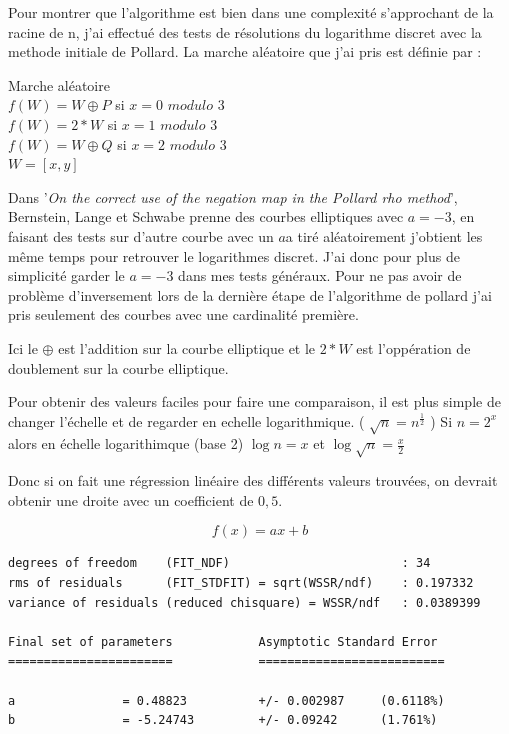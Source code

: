 \documentclass[a4paper,10pt]{report}
\newcommand{\article}{\textit{On the correct use of the negation map in the Pollard rho method}}
\begin{document}
Pour montrer que l'algorithme est bien dans une complexité s'approchant de la racine de n, j'ai effectué des tests de résolutions du logarithme discret avec la methode initiale
de Pollard. La marche aléatoire que j'ai pris est définie par : \\

\begin{description}
\item{Marche aléatoire}\\
  $ f(W) = W \oplus P$ si $x = 0$ $modulo$ $3$ \\
  $ f(W) = 2*W$ si $x = 1$ $modulo$ $3$ \\
  $ f(W) = W \oplus Q$ si $x = 2$  $modulo$ $3$ \\
  $ W = [x,y] $ \\
\end{description}

Dans '\article', Bernstein, Lange et Schwabe prenne des courbes elliptiques avec $a = -3$, en faisant des tests sur d'autre courbe avec un $a$a tiré aléatoirement j'obtient les même temps pour
retrouver le logarithmes discret. J'ai donc pour plus de simplicité garder le $a=-3$ dans mes tests généraux.
Pour ne pas avoir de problème d'inversement lors de la dernière étape de l'algorithme de pollard j'ai pris seulement des courbes avec une cardinalité première.

Ici le $\oplus$ est l'addition sur la courbe elliptique et le $2*W$ est l'oppération de doublement sur la courbe elliptique.

Pour obtenir des valeurs faciles pour faire une comparaison, il est plus simple de changer l'échelle et de regarder en echelle logarithmique.
( $\sqrt{n} = n^{\frac{1}{2}}$ )
 Si $n=2^x$ alors en échelle logarithimque (base 2) $\log{n} = x$ et $\log{\sqrt{n}} = \frac{x}{2}$

Donc si on fait une régression linéaire des différents valeurs trouvées, on devrait obtenir une droite avec un coefficient de $0,5$.

\newpage
$$f(x) = ax + b $$


\begin{verbatim}
degrees of freedom    (FIT_NDF)                        : 34
rms of residuals      (FIT_STDFIT) = sqrt(WSSR/ndf)    : 0.197332
variance of residuals (reduced chisquare) = WSSR/ndf   : 0.0389399

Final set of parameters            Asymptotic Standard Error
=======================            ==========================

a               = 0.48823          +/- 0.002987     (0.6118%)
b               = -5.24743         +/- 0.09242      (1.761%)
\end{verbatim}
\end{document}

